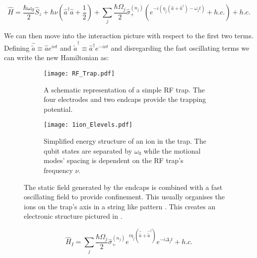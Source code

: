 \documentclass[12pt,twoside]{report}
\begin{document}
\begin{equation}
	\hat{H} = \frac{\hbar \omega_0}{2}\hat{S}_z + \hbar\nu\left(\hat{a}^\dagger\hat{a} + \frac{1}{2}\right) + \sum_{j}\frac{\hbar\Omega_j}{2}\hat{\sigma}^{\left(n_j\right)}_+\left(e^{-i\left(\eta_j\left(\hat{a} + \hat{a}^\dagger\right) - \omega_jt\right)} + h.c.\right) + h.c.
	\label{eq:RF_Trap_H_driven_LD_param}
\end{equation}

We can then move into the interaction picture with respect to the first two terms. Defining $\hat{\tilde{a}}\equiv\hat{a}e^{i\nu t}$ and $\hat{\tilde{a}}^\dagger\equiv\hat{a}^\dagger e^{-i\nu t}$ and disregarding the fast oscillating terms we can write the new Hamiltonian as:

\begin{figure}[t!]
	\centering
	\begin{subfigure}[t]{0.4\textwidth}
		\centering
		\texttt{[image: RF\_Trap.pdf]}
		\caption{A schematic representation of a simple RF trap. The four electrodes and two endcaps provide the trapping potential.}
		\label{fig:rftrap:schematic}
	\end{subfigure}
	\hfill
	\begin{subfigure}[t]{0.55\textwidth}
		\centering
		\texttt{[image: 1ion\_Elevels.pdf]}
		\caption{Simplified energy structure of an ion in the trap. The qubit states are separated by $\omega_0$ while the motional modes' spacing is dependent on the RF trap's frequency $\nu$.}
		\label{fig:rftrap:estructure}
	\end{subfigure}
	\caption[RF Trap schematic and energy]{The static field generated by the endcaps is combined with a fast oscillating field to provide confinement. This usually organises the ions on the trap's axis in a string like pattern \cite{RF_Traps,Charged_Particle_traps_Paul}. This creates an electronic structure pictured in .}
	\label{fig:rftrap}
\end{figure}

\begin{equation}
	\hat{H}_I = \sum_{j}\frac{\hbar\Omega_j}{2}\hat{\sigma}^{\left(n_j\right)}_+e^{i\eta_j\left(\hat{\tilde{a}} + \hat{\tilde{a}}^\dagger\right)} e^{-i\Delta_jt} + h.c.
	\label{eq:Interaction_H}
\end{equation}
\end{document}
